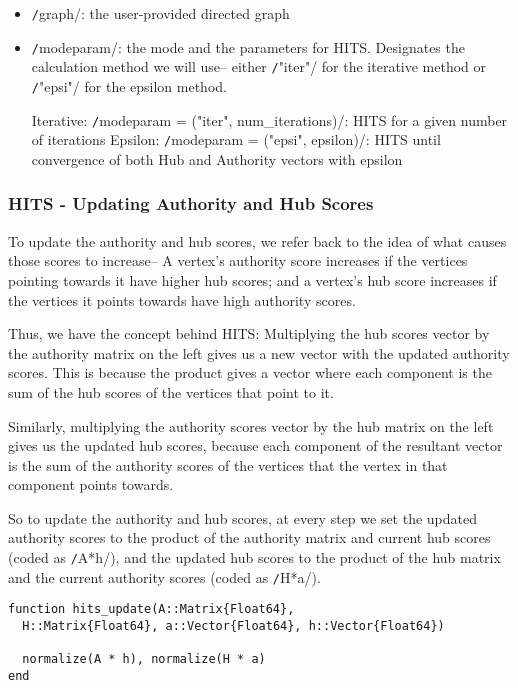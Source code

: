 \documentclass[12pt, titlepage, twoside]{amsart}
\begin{document}
\begin{itemize}[label={}]
\item \texttt/graph/: the user-provided directed graph

\item \texttt/modeparam/: the mode and the parameters for HITS.
Designates the calculation method we will use--
either \texttt/"iter"/ for the iterative method or \texttt/"epsi"/ for the epsilon method.

Iterative: \texttt/modeparam = ("iter", num_iterations)/:
HITS for a given number of iterations
Epsilon: \texttt/modeparam = ("epsi", epsilon)/: HITS until convergence of
both Hub and Authority vectors with epsilon
\end{itemize}

\subsubsection{HITS - Updating Authority and Hub Scores}

To update the authority and hub scores, we refer back to the idea of what causes those scores to increase--
A vertex's authority score increases if the vertices pointing towards it have higher hub scores;
and a vertex's hub score increases if the vertices it points towards have high authority scores.

Thus, we have the concept behind HITS:
Multiplying the hub scores vector by the authority matrix on the left gives us a new vector with the updated authority scores.
This is because the product gives a vector where each component is the sum of the hub scores of the vertices that point to it.

Similarly, multiplying the authority scores vector by the hub matrix on the left gives us the updated hub scores,
because each component of the resultant vector is the sum of the authority scores of the vertices that the vertex in that component points towards.

So to update the authority and hub scores, at every step we set the updated authority scores to the product of the authority matrix and current hub scores (coded as \texttt/A*h/), and the updated hub scores to the product of the hub matrix and the current authority scores (coded as \texttt/H*a/).

\begin{verbatim}
function hits_update(A::Matrix{Float64},
  H::Matrix{Float64}, a::Vector{Float64}, h::Vector{Float64})

  normalize(A * h), normalize(H * a)
end
\end{verbatim}
\end{document}
